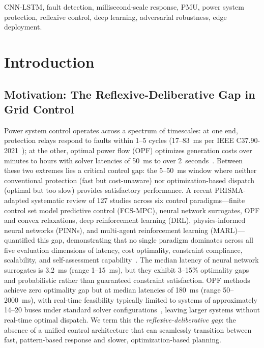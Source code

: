 \documentclass[journal]{IEEEtran}
\begin{document}
\begin{IEEEkeywords}
CNN-LSTM, fault detection, millisecond-scale response, PMU, power system protection, reflexive control, deep learning, adversarial robustness, edge deployment.
\end{IEEEkeywords}

\section{Introduction}
\label{sec:intro}

\subsection{Motivation: The Reflexive-Deliberative Gap in Grid Control}

Power system control operates across a spectrum of timescales: at one end, protection relays respond to faults within 1--5 cycles (17--83~ms per IEEE C37.90-2021~\cite{ref3}); at the other, optimal power flow (OPF) optimizes generation costs over minutes to hours with solver latencies of 50~ms to over 2~seconds~\cite{ref32}. Between these two extremes lies a critical control gap: the 5--50~ms window where neither conventional protection (fast but cost-unaware) nor optimization-based dispatch (optimal but too slow) provides satisfactory performance. A recent PRISMA-adapted systematic review of 127 studies across six control paradigms---finite control set model predictive control (FCS-MPC), neural network surrogates, OPF and convex relaxations, deep reinforcement learning (DRL), physics-informed neural networks (PINNs), and multi-agent reinforcement learning (MARL)---quantified this gap, demonstrating that no single paradigm dominates across all five evaluation dimensions of latency, cost optimality, constraint compliance, scalability, and self-assessment capability~\cite{ref_litreview}. The median latency of neural network surrogates is 3.2~ms (range 1--15~ms), but they exhibit 3--15\% optimality gaps and probabilistic rather than guaranteed constraint satisfaction. OPF methods achieve zero optimality gap but at median latencies of 180~ms (range 50--2000~ms), with real-time feasibility typically limited to systems of approximately 14--20 buses under standard solver configurations~\cite{ref32,ref33}, leaving larger systems without real-time optimal dispatch. We term this the \emph{reflexive-deliberative gap}: the absence of a unified control architecture that can seamlessly transition between fast, pattern-based response and slower, optimization-based planning.
\end{document}
